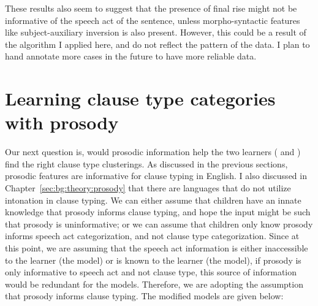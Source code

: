These results also seem to suggest that the presence of final rise might not be informative of the speech act of the sentence, unless morpho-syntactic features like subject-auxiliary inversion is also present. However, this could be a result of the algorithm I applied here, and do not reflect the pattern of the data. I plan to hand annotate more cases in the future to have more reliable data.

\section{Learning clause type categories with prosody}\label{sec:prosody:model}

Our next question is, would prosodic information help the two learners (\distlearner{} and \praglearner{}) find the right clause type clusterings. As discussed in the previous sections, prosodic features are informative for clause typing in English. I also discussed in Chapter~\ref{sec:bg:theory:prosody} that there are languages that do not utilize intonation in clause typing. We can either assume that children have an innate knowledge that prosody informs clause typing, and hope the input might be such that prosody is uninformative; or we can assume that children only know  prosody informs speech act categorization, and not clause type categorization. Since at this point, we are assuming that the speech act information is either inaccessible to the learner (the \dlearnerabbr{} model) or is known to the learner (the \plearnerabbr{} model), if prosody is only informative to speech act and not clause type, this source of information would be redundant for the models. Therefore, we are adopting the assumption that prosody informs clause typing. The modified models are given below:

